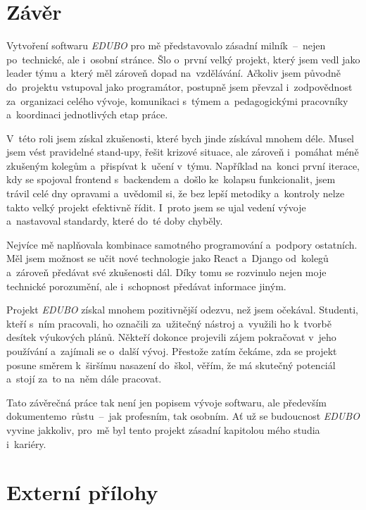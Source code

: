 \documentclass[male,czech,api_bc]{kitheses}
\begin{document}
\chapter{Závěr}

Vytvoření softwaru \textit{EDUBO} pro mě představovalo zásadní milník~--~nejen po~technické, ale i~osobní stránce. Šlo o~první velký projekt, který jsem vedl jako leader týmu a~který měl zároveň dopad na~vzdělávání. Ačkoliv jsem původně do~projektu vstupoval jako programátor, postupně jsem převzal i~zodpovědnost za~organizaci celého vývoje, komunikaci s~týmem a~pedagogickými pracovníky a~koordinaci jednotlivých etap práce.

V~této roli jsem získal zkušenosti, které bych jinde získával mnohem déle. Musel jsem vést pravidelné stand-upy, řešit krizové situace, ale zároveň i~pomáhat méně zkušeným kolegům a~přispívat k~učení v~týmu. Například na~konci první iterace, kdy se spojoval frontend s~backendem a~došlo ke~kolapsu funkcionalit, jsem trávil celé dny opravami a~uvědomil si, že bez lepší metodiky a~kontroly nelze takto velký projekt efektivně řídit. I~proto jsem se ujal vedení vývoje a~nastavoval standardy, které do~té doby chyběly.

Nejvíce mě naplňovala kombinace samotného programování a~podpory ostatních. Měl jsem možnost se učit nové technologie jako React a~Django od~kolegů a~zároveň předávat své zkušenosti dál. Díky tomu se rozvinulo nejen moje technické porozumění, ale i~schopnost předávat informace jiným.

Projekt \textit{EDUBO} získal mnohem pozitivnější odezvu, než jsem očekával. Studenti, kteří s~ním pracovali, ho označili za~užitečný nástroj a~využili ho k~tvorbě desítek výukových plánů. Někteří dokonce projevili zájem pokračovat v~jeho používání a~zajímali se o~další vývoj. Přestože zatím čekáme, zda se projekt posune směrem k~širšímu nasazení do~škol, věřím, že má skutečný potenciál a~stojí za~to na~něm dále pracovat.

Tato závěrečná práce tak není jen popisem vývoje softwaru, ale především dokumentem\break o~růstu~--~jak profesním, tak osobním. Ať už se budoucnost \textit{EDUBO} vyvine jakkoliv, pro~mě byl tento projekt zásadní kapitolou mého studia i~kariéry.

\sloppy
\printbibliography[title=Seznam použitých zdrojů]

\chapter{Externí přílohy}
\end{document}
